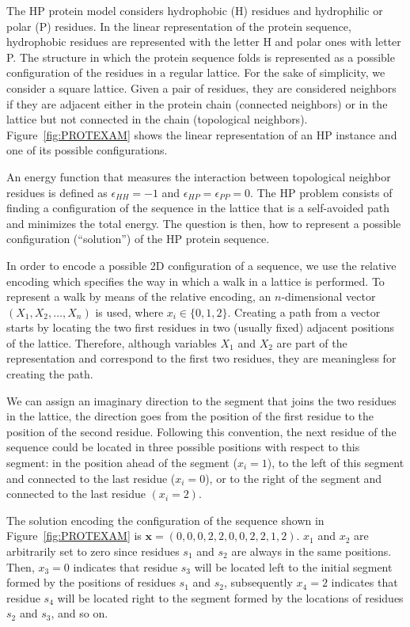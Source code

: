 The HP protein model considers  hydrophobic (H) residues  and   hydrophilic or polar (P) residues.   In the linear representation of the protein sequence,  hydrophobic residues are represented with the letter H and polar ones with letter P. The structure in which the protein sequence folds is represented as a possible  configuration of the residues  in a regular lattice. For the sake of simplicity, we consider a square lattice.  Given a pair of residues, they are  considered neighbors if they are adjacent  either in the protein chain  (connected neighbors) or in the lattice but not connected in the chain (topological neighbors). Figure~\ref{fig:PROTEXAM} shows the linear representation of an HP instance and one of its possible configurations. 

  An energy function that  measures the interaction  between topological  neighbor residues is defined  as  $\epsilon_{HH}=-1$ and  $\epsilon_{HP}=\epsilon_{PP}=0$. The HP problem consists of  finding a configuration of the sequence in the lattice that is a self-avoided path and minimizes the total energy. The question is then, how to represent a possible configuration (``solution'') of the HP protein sequence. 

  In order to encode a possible 2D configuration of a sequence, we use the relative encoding \cite{Krasnogor_et_al:1999} which specifies the way in which a walk in a lattice is performed. To represent a walk by means of the relative encoding, an $n$-dimensional vector $(X_1,X_2,\dots, X_n)$ is used, where $x_i \in \{0,1,2\}$. Creating a path from a vector starts by locating the two first residues in two (usually fixed) adjacent positions of the lattice. Therefore, although variables $X_1$ and $X_2$ are part of the representation and correspond to the first two residues, they are meaningless for creating the path.

   We can assign an imaginary  direction to the segment that joins the two residues in the lattice, the direction goes from the position of the first residue to the position of the second residue. Following this convention, the next residue of the sequence could be located in three possible positions with respect to this segment: in the position ahead of the segment ($x_i=1$), to the left of this segment  and connected to the last residue ($x_i=0$), or to the right of the segment and connected to the last residue $(x_i=2)$.

  The solution encoding the configuration of the sequence shown in Figure~\ref{fig:PROTEXAM} is $\textbf{x} = (0,0,0,2,2,0,0,2,2,1,2)$. $x_1$ and $x_2$ are arbitrarily set to zero since residues $s_1$ and $s_2$ are always in the same positions. Then, $x_3=0$ indicates that residue $s_3$ will be located  left  to the initial segment formed by the positions of residues $s_1$ and $s_2$, subsequently  $x_4=2$ indicates that residue $s_4$ will be located  right to the segment formed by the locations of residues $s_2$ and $s_3$, and so on.  

